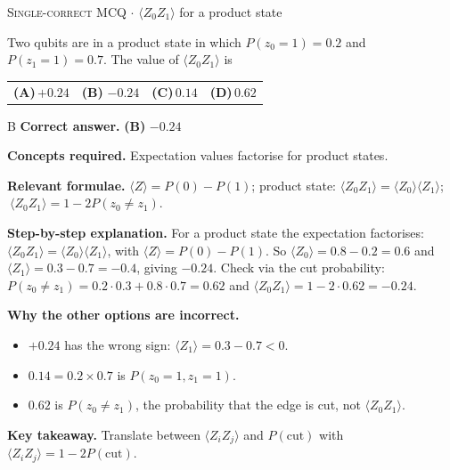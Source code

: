 \documentclass[11pt,a4paper]{article}
\newcommand{\optlabel}[1]{\textbf{(#1)}}
\newcommand{\correctlabel}[1]{\textcolor{okgreen}{\textbf{(#1)}\,\ding{51}}}
\newenvironment{qitem}[1]{\begin{list}{}{\setlength{\leftmargin}{3.3em}\setlength{\labelwidth}{3.1em}%
  \setlength{\labelsep}{0.2em}\setlength{\topsep}{3pt}\setlength{\parsep}{3pt}}\item[\textbf{Q.#1}\hfill]}{\end{list}}
\newcommand{\qsep}{\par\vspace{2pt}{\color{black!15}\hrule}\vspace{4pt}}
\newcommand{\qmeta}[2]{{\footnotesize\color{black!60}\textsc{#1} \;$\cdot$\; #2}\par}
\begin{document}
\begin{qitem}{30}
\qmeta{Single-correct MCQ}{$\langle Z_0Z_1\rangle$ for a product state}
Two qubits are in a product state in which $P(z_0 = 1) = 0.2$ and $P(z_1 = 1) = 0.7$. The value of $\langle Z_0Z_1\rangle$ is
\par\smallskip\noindent\begin{tabularx}{\linewidth}{@{}*{4}{L}@{}}
\optlabel{A}\,$+0.24$ & \correctlabel{B}\,$-0.24$ & \optlabel{C}\,$0.14$ & \optlabel{D}\,$0.62$
\end{tabularx}
\end{qitem}
\begin{solbox}{B}
\textbf{\color{brand}Correct answer.} \textcolor{okgreen}{\textbf{(B)}} $-0.24$

\textbf{\color{brand}Concepts required.} Expectation values factorise for product states.

\textbf{\color{brand}Relevant formulae.} $\langle Z\rangle = P(0) - P(1)$; product state: $\langle Z_0Z_1\rangle = \langle Z_0\rangle\langle Z_1\rangle$; $\ \langle Z_0Z_1\rangle = 1 - 2P(z_0\neq z_1)$.

\textbf{\color{brand}Step-by-step explanation.} For a product state the expectation factorises: $\langle Z_0Z_1\rangle = \langle Z_0\rangle\langle Z_1\rangle$, with
$\langle Z\rangle = P(0) - P(1)$. So $\langle Z_0\rangle = 0.8 - 0.2 = 0.6$ and $\langle Z_1\rangle = 0.3 - 0.7 = -0.4$, giving $-0.24$.
Check via the cut probability: $P(z_0 \neq z_1) = 0.2\cdot0.3 + 0.8\cdot0.7 = 0.62$ and $\langle Z_0Z_1\rangle = 1 - 2\cdot0.62 = -0.24$.

\textbf{\color{brand}Why the other options are incorrect.}
\begin{itemize}[leftmargin=2.4em, itemsep=1pt, topsep=2pt]
\item[\textbf{(A)}] $+0.24$ has the wrong sign: $\langle Z_1\rangle = 0.3 - 0.7 < 0$.
\item[\textbf{(C)}] $0.14 = 0.2\times0.7$ is $P(z_0 = 1, z_1 = 1)$.
\item[\textbf{(D)}] $0.62$ is $P(z_0\neq z_1)$, the probability that the edge is cut, not $\langle Z_0Z_1\rangle$.
\end{itemize}
\textbf{\color{brand}Key takeaway.} Translate between $\langle Z_iZ_j\rangle$ and $P(\text{cut})$ with $\langle Z_iZ_j\rangle = 1 - 2P(\text{cut})$.
\end{solbox}
\qsep
\end{document}
